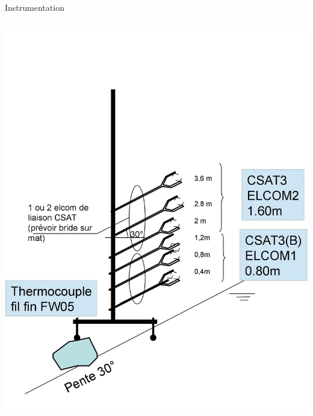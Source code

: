 \documentclass{beamer}
\begin{document}

\begin{frame}{Instrumentation}

\begin{columns}
\includegraphics[width=1.1\textwidth]{fig/0001.jpg}

\end{columns}
\end{frame}
\end{document}
